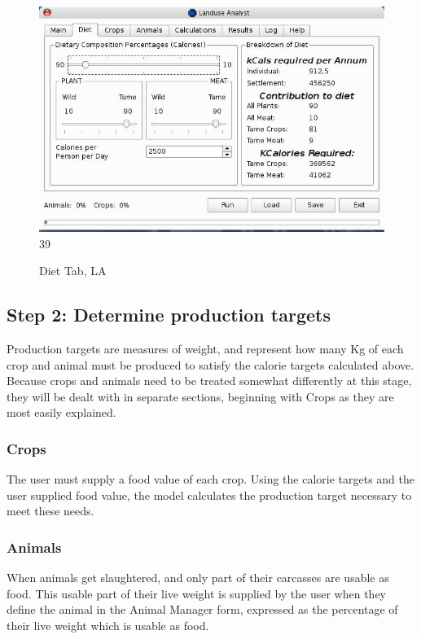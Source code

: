 \begin{figure}[htbp]
  \label{fig:LADiet}%
    \includegraphics[scale=.355]{./images/LanduseAnalystDiet545.jpg}
39
  \caption{ Diet Tab, LA}
\end{figure}

\subsection{Step 2: Determine production targets}
  Production targets are measures of weight, and represent how many Kg of each
  crop and animal must be produced to satisfy the calorie targets calculated
  above.  Because crops and animals need to be treated somewhat differently at
  this stage, they will be dealt with in separate sections, beginning with Crops
  as they are most easily explained.

  \subsubsection{Crops}
The user must supply a food value of each crop.  Using the calorie targets and
the user supplied food value, the model calculates the production target
necessary to meet these needs.

  \subsubsection{Animals}
When animals get slaughtered, and only part of their carcasses are usable as
food.  This usable part of their live weight is supplied by the user when they
define the animal in the Animal Manager form, expressed as the percentage of
their live weight which is usable as food.

